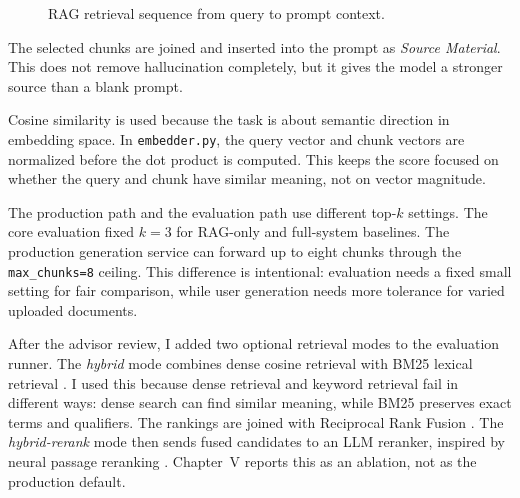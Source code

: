 \documentclass[12pt,a4paper]{article}
\begin{document}
\begin{figure}[H]
  \centering
  \singlespacing
  \caption{RAG retrieval sequence from query to prompt context.}
  \label{fig:retrieval}
\end{figure}

The selected chunks are joined and inserted into the prompt as
\textit{Source Material}. This does not remove hallucination completely, but
it gives the model a stronger source than a blank prompt.

Cosine similarity is used because the task is about semantic direction in
embedding space. In \texttt{embedder.py}, the query vector and chunk vectors
are normalized before the dot product is computed. This keeps the score
focused on whether the query and chunk have similar meaning, not on vector
magnitude.

The production path and the evaluation path use different top-$k$ settings.
The core evaluation fixed $k = 3$ for RAG-only and full-system baselines.
The production generation service can forward up to eight chunks through the
\texttt{max\_chunks=8} ceiling. This difference is intentional: evaluation
needs a fixed small setting for fair comparison, while user generation needs
more tolerance for varied uploaded documents.

After the advisor review, I added two optional retrieval modes to the
evaluation runner. The \textit{hybrid} mode combines dense cosine retrieval
with BM25 lexical retrieval \cite{robertson2009bm25}. I used this because
dense retrieval and keyword retrieval fail in different ways: dense search
can find similar meaning, while BM25 preserves exact terms and qualifiers.
The rankings are joined with Reciprocal Rank Fusion \cite{cormack2009rrf}.
The \textit{hybrid-rerank} mode then sends fused candidates to an LLM
reranker, inspired by neural passage reranking \cite{nogueira2019bert}.
Chapter~V reports this as an ablation, not as the production default.
\end{document}
